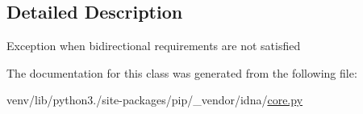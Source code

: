 \subsection{Detailed Description}
\begin{DoxyVerb}Exception when bidirectional requirements are not satisfied \end{DoxyVerb}
 

The documentation for this class was generated from the following file\+:\begin{DoxyCompactItemize}
\item 
venv/lib/python3./site-\/packages/pip/\+\_\+vendor/idna/\hyperlink{pip_2__vendor_2idna_2core_8py}{core.\+py}\end{DoxyCompactItemize}
